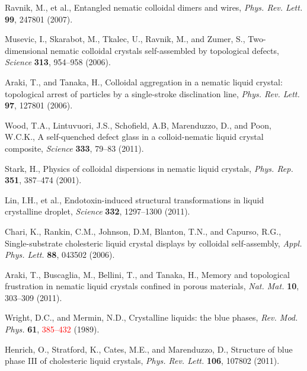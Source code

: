 \documentclass[12pt]{article}
\begin{document}
\pagebreak

\begin{thebibliography}{99}

Ravnik, M., et al.,
Entangled nematic colloidal dimers and wires, 
{\it Phys. Rev. Lett.} {\bf 99}, 247801 (2007).

Musevic, I., Skarabot, M., Tkalec, U., Ravnik, M., and Zumer, S.,
Two-dimensional nematic colloidal crystals self-assembled by topological
defects,
{\it Science} {\bf 313}, 954--958 (2006).

Araki, T., and Tanaka, H.,
Colloidal aggregation in a nematic liquid crystal: topological arrest of
particles by a single-stroke disclination line,
{\it Phys. Rev. Lett.} {\bf 97}, 127801 (2006).

Wood, T.A., Lintuvuori, J.S., Schofield, A.B, Marenduzzo, D., and
Poon, W.C.K.,
A self-quenched defect glass in a colloid-nematic liquid crystal composite,
{\it Science} {\bf 333}, 79--83 (2011).

 Stark, H.,
Physics of colloidal dispersions in nematic liquid crystals,
{\it Phys. Rep.} {\bf 351}, 387--474 (2001).

Lin, I.H., et al.,
Endotoxin-induced structural transformations in liquid crystalline droplet,
{\it Science} {\bf 332}, 1297--1300 (2011).

Chari, K., Rankin, C.M., Johnson, D.M, Blanton, T.N., and Capurso, R.G.,
Single-substrate cholesteric liquid crystal displays by colloidal
self-assembly,
{\it Appl. Phys. Lett.} {\bf 88}, 043502 (2006).

Araki, T., Buscaglia, M., Bellini, T., and Tanaka, H.,
Memory and topological frustration in nematic liquid crystals confined
in porous materials, {\it Nat. Mat.} {\bf 10}, 303--309 (2011).

 Wright, D.C., and Mermin, N.D.,
Crystalline liquids: the blue phases, {\it Rev. Mod. Phys.} {\bf 61},
\textcolor{red}{385--432} (1989).

 Henrich, O., Stratford, K., Cates, M.E., and Marenduzzo, D.,
 Structure of blue phase III of cholesteric liquid crystals,
{\it Phys. Rev. Lett.} {\bf 106}, 107802 (2011).


\end{thebibliography}
\end{document}
